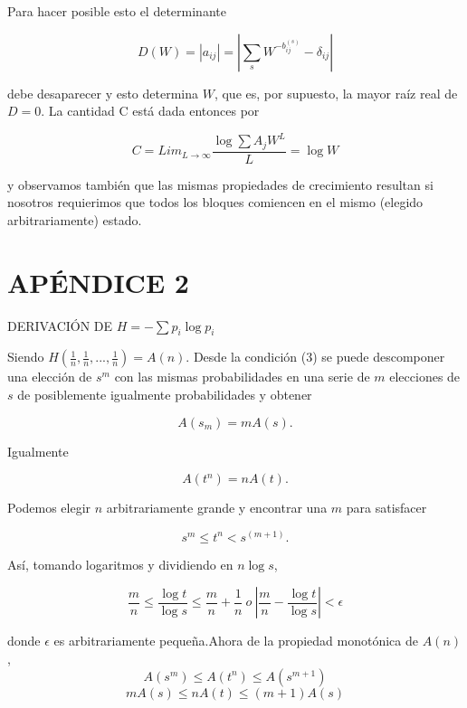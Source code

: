 Para hacer posible esto el determinante

\begin{equation}
D(W)=\left| a_{ij}\right| =\left| \sum_{s}W^{-b_{ij}^{(s)}}-\delta_{ij}\right|
\end{equation}

debe desaparecer y esto determina $W$, que es, por supuesto, la mayor raíz real de $D = 0$.
La cantidad C est\'a dada entonces por

\begin{equation}
C=Lim_{L\rightarrow \infty}\frac{\log \sum A_{j}W^{L}}{L}=\log W
\end{equation}

y observamos tambi\'en que las mismas propiedades de crecimiento resultan si nosotros 
requierimos que todos los bloques comiencen en el mismo (elegido arbitrariamente) estado.

\section{AP\'ENDICE 2}

DERIVACI\'ON DE $H=-\sum p_{i}\log  p_{i}$

Siendo $H(\frac{1}{n},\frac{1}{n},...,\frac{1}{n})=A(n)$. Desde la condici\'on (3) se 
puede descomponer una elecci\'on de $s^{m}$ con las mismas probabilidades en una 
serie de $m$ elecciones de $s$ de posiblemente igualmente probabilidades y obtener

\begin{equation}
A(s_{m})=mA(s).
\end{equation}

Igualmente

\begin{equation}
A(t^{n})=nA(t).
\end{equation}

Podemos elegir $n$ arbitrariamente grande y encontrar una $m$ para satisfacer

\begin{equation}
s^{m} \leq t^{n} < s^{(m+1)}.
\end{equation}

As\'i, tomando logaritmos y dividiendo en $n\log s$,

\begin{equation}
\frac{m}{n}\leq \frac{\log  t}{\log  s}\leq \frac{m}{n}+\frac{1}{n} \ o \ 
\left|\frac{m}{n}-\frac{\log  t}{\log  s}\right| < \epsilon 
\end{equation}

donde $\epsilon$ es arbitrariamente peque\~na.Ahora de la propiedad 
monot\'onica de $A(n)$,
\begin{equation}
A(s^{m})\leq A(t^{n})\leq A(s^{m+1})
\end{equation}
\begin{equation}
mA(s)\leq nA(t) \leq (m+1)A(s)
\end{equation}

